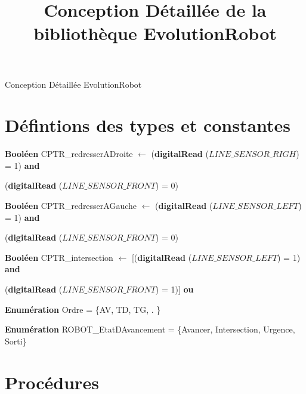 \documentclass[a4paper, 11pt]{article}
\title{Conception Détaillée de la bibliothèque EvolutionRobot}
\author{}
\date{}
\begin{document}
%
%
\selectfont
\begin{center}
    \Huge{Conception Détaillée EvolutionRobot}
\end{center}

\section*{Défintions des types et constantes}

\textbf{Booléen} CPTR\_redresserADroite $\leftarrow$  (\textbf{digitalRead} ($LINE\_SENSOR\_RIGH$) = 1) \textbf{and} 

\indent\indent(\textbf{digitalRead} ($LINE\_SENSOR\_FRONT$) = 0)

\textbf{Booléen} CPTR\_redresserAGauche $\leftarrow$  (\textbf{digitalRead} ($LINE\_SENSOR\_LEFT$) = 1) \textbf{and} 

\indent\indent(\textbf{digitalRead} ($LINE\_SENSOR\_FRONT$) = 0)

\textbf{Booléen} CPTR\_intersection $\leftarrow$  [(\textbf{digitalRead} ($LINE\_SENSOR\_LEFT$) = 1) \textbf{and} 

\indent\indent(\textbf{digitalRead} ($LINE\_SENSOR\_FRONT$) = 1)] \textbf{ou}

\indent\indent[(\textbf{digitalRead} ($LINE\_SENSOR\_RIGHT$) = 1) \textbf{and}

\indent\indent(\textbf{digitalRead} ($LINE\_SENSOR\_FRONT$) = 1)]

\indent\textbf{Enumération} Ordre = \{AV, TD, TG, . \}

\indent\textbf{Enumération} ROBOT\_EtatDAvancement = \{Avancer, Intersection, Urgence, Sorti\}

\section*{Procédures}
\end{document}

